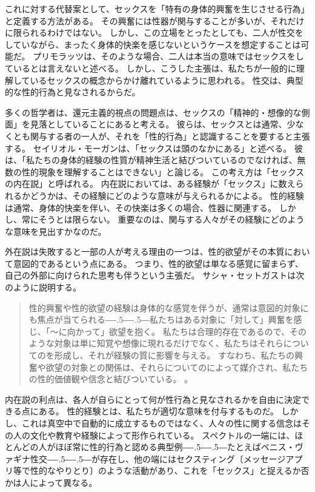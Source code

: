 \documentclass[paper=a4,book,openany]{jlreq}
\newcommand{\ig}[1]{}           %
\def\DDASH{―\kern-.5\zw―\kern-.5\zw―} %
\begin{document}
これに対する代替案として、セックスを「特有の身体的興奮を生じさせる行為」と定義する方法がある。
その興奮には性器が関与することが多いが、それだけに限られるわけではない\citep{janssen02:_sexual_inhib_sis1,janssen02:_sexual_inhib_sis2}。
しかし、この立場をとったとしても、二人が性交をしていながら、まったく身体的快楽を感じないというケースを想定することは可能だ。
プリモラッツは、そのような場合、二人は本当の意味ではセックスをしているとは言えないと述べる\citep[pp.47--49]{primoratz99:_ethic_and_sex}。
しかし、こうした主張は、私たちが一般的に理解しているセックスの概念からかけ離れているように思われる。
性交は、典型的な性的行為と見なされるからだ。

多くの哲学者は、還元主義的視点の問題点は、セックスの「精神的・想像的な側面」を見落としていることにあると考える。
彼らは、セックスとは通常、少なくとも関与する者の一人が、それを「性的行為」と認識することを要すると主張する。
セイリオル・モーガン\ig{セイリオル・モーガン}は、「セックスは頭のなかにある」と述べる。
彼は、「私たちの身体的経験の性質が精神生活と結びついているのでなければ、無数の性的現象を理解することはできない」と論じる\citep[p.5]{morgan03:_sex_in_head}。
この考え方は「セックスの内在説」と呼ばれる。
内在説においては、ある経験が「セックス」に数えられるかどうかは、その経験にどのような意味が与えられるかによる。
性的経験は通常、身体的快楽を伴い、その快楽は多くの場合、性器に関連する。
しかし、常にそうとは限らない。
重要なのは、関与する人々がその経験にどのような意味を見出すかなのだ。

外在説は失敗すると一部の人が考える理由の一つは、性的欲望がその本質において意図的であるという点にある。
つまり、性的欲望は単なる感覚に留まらず、自己の外部に向けられた思考も伴うという主張だ。
サシャ・セットガストは次のように説明する。
\begin{quote}
  性的興奮や性的欲望の経験は身体的な感覚を伴うが、通常は意図的対象にも焦点が当てられる{\DDASH}私たちはある対象に「対して」興奮を感じ、「～に向かって」欲望を抱く。
私たちは合理的存在であるので、そのような対象は単に知覚や想像に現れるだけでなく、私たちはそれらについてのを形成し、それが経験の質に影響を与える。
すなわち、私たちの興奮や欲望の対象との関係は、それらについてのによって媒介され、私たちの性的価値観や信念と結びついている。  \citep[p.384, 強調は原文]{settegast18:_prost_good_sex}。
\end{quote}

内在説の利点は、各人が自らにとって何が性行為と見なされるかを自由に決定できる点にある。
性的経験とは、私たちが適切な意味を付与するものだ。
しかし、これは真空中で自動的に成立するものではなく、人々の性に関する信念はその人の文化や教育や経験によって形作られている。
スペクトルの一端には、ほとんどの人がほぼ常に性的行為と認める典型例{\DDASH}たとえばペニス・ヴァギナ性交{\DDASH}が存在し、他の端にはセクスティング〔メッセージアプリ等で性的なやりとり〕のような活動があり、これを「セックス」と捉えるか否かは人によって異なる。
\end{document}
